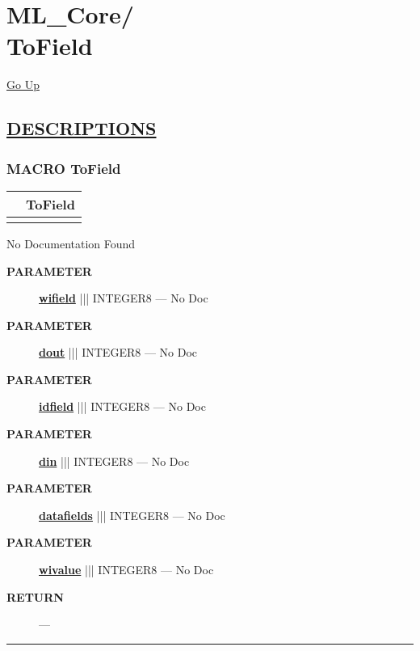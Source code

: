 \chapter*{\color{headfile}
{\large ML\_Core\slash\hspace{0pt}}
 \\
ToField
}
\hypertarget{ecldoc:toc:ML_Core.ToField}{}
\hyperlink{ecldoc:toc:root/ML_Core}{Go Up}


\section*{\underline{\textsf{DESCRIPTIONS}}}
\subsection*{\textsf{\colorbox{headtoc}{\color{white} MACRO}
ToField}}

\hypertarget{ecldoc:ml_core.tofield}{}

{\renewcommand{\arraystretch}{1.5}
\begin{tabularx}{\textwidth}{|>{\raggedright\arraybackslash}l|X|}
\hline
\hspace{0pt}\mytexttt{\color{red} } & \textbf{ToField} \\
\hline
\multicolumn{2}{|>{\raggedright\arraybackslash}X|}{\hspace{0pt}\mytexttt{\color{param} (dIn,dOut,idfield='', wifield='', wivalue='',datafields='')}} \\
\hline
\end{tabularx}
}

\par





No Documentation Found






\par
\begin{description}
\item [\colorbox{tagtype}{\color{white} \textbf{\textsf{PARAMETER}}}] \textbf{\underline{wifield}} ||| INTEGER8 --- No Doc
\item [\colorbox{tagtype}{\color{white} \textbf{\textsf{PARAMETER}}}] \textbf{\underline{dout}} ||| INTEGER8 --- No Doc
\item [\colorbox{tagtype}{\color{white} \textbf{\textsf{PARAMETER}}}] \textbf{\underline{idfield}} ||| INTEGER8 --- No Doc
\item [\colorbox{tagtype}{\color{white} \textbf{\textsf{PARAMETER}}}] \textbf{\underline{din}} ||| INTEGER8 --- No Doc
\item [\colorbox{tagtype}{\color{white} \textbf{\textsf{PARAMETER}}}] \textbf{\underline{datafields}} ||| INTEGER8 --- No Doc
\item [\colorbox{tagtype}{\color{white} \textbf{\textsf{PARAMETER}}}] \textbf{\underline{wivalue}} ||| INTEGER8 --- No Doc
\end{description}







\par
\begin{description}
\item [\colorbox{tagtype}{\color{white} \textbf{\textsf{RETURN}}}] \textbf{} --- 
\end{description}




\rule{\linewidth}{0.5pt}
